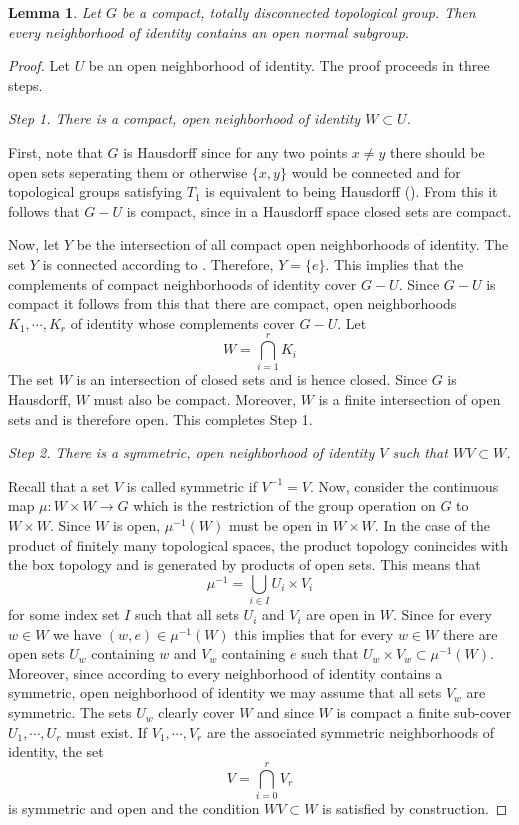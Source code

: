 \documentclass[12pt]{article}
\newtheorem{lem}[thm]{Lemma}
\theoremstyle{definition}
\theoremstyle{remark}
\begin{document}
    \begin{lem}\label{lem:ons}
        Let $G$ be a compact, totally disconnected topological group. Then every neighborhood of identity contains an open normal subgroup.
    \end{lem}

    \begin{proof}
        Let $U$ be an open neighborhood of identity. The proof proceeds in three steps.

        \noindent\emph{Step 1. There is a compact, open neighborhood of identity $W\subset U$.}

        First, note that $G$ is Hausdorff since for any two points $x\neq y$ there should be open sets seperating them or otherwise $\{x,y\}$ would be connected and for topological groups satisfying $T_1$ is equivalent to being Hausdorff (\cite[Proposition 1-3]{FANF1999}). From this it follows that $G-U$ is compact, since in a Hausdorff space closed sets are compact.

        Now, let $Y$ be the intersection of all compact open neighborhoods of identity. The set $Y$ is connected according to \cite[Lemma 1-16]{FANF1999}. Therefore, $Y=\{e\}$. This implies that the complements of compact neighborhoods of identity cover $G-U$. Since $G-U$ is compact it follows from this that there are compact, open neighborhoods $K_1,\cdots,K_r$ of identity whose complements cover $G-U$. Let
        $$
        W=\bigcap_{i=1}^r K_i
        $$
        The set $W$ is an intersection of closed sets and is hence closed. Since $G$ is Hausdorff, $W$ must also be compact. Moreover, $W$ is a finite intersection of open sets and is therefore open. This completes Step 1.
        
        \noindent\emph{Step 2. There is a symmetric, open neighborhood of identity $V$ such that $WV\subset W$.}

        Recall that a set $V$ is called symmetric if $V^{-1}=V$. Now, consider the continuous map $\mu\colon W\times W \to G$ which is the restriction of the group operation on $G$ to $W \times W$. Since $W$ is open, $\mu^{-1}(W)$ must be open in $W \times W$. In the case of the product of finitely many topological spaces, the product topology conincides with the box topology and is generated by products of open sets. This means that
        $$ \mu^{-1} = \bigcup_{i \in I} U_i \times V_i $$
        for some index set $I$ such that all sets $U_i$ and $V_i$ are open in $W$. Since for every $w \in W$ we have $(w,e)\in\mu^{-1}(W)$ this implies that for every $w\in W$ there are open sets $U_w$ containing $w$ and $V_w$ containing $e$ such that $U_w\times V_w\subset \mu^{-1}(W)$. Moreover, since according to \cite[Proposition 1-1(ii)]{FANF1999} every neighborhood of identity contains a symmetric, open neighborhood of identity we may assume that all sets $V_w$ are symmetric. The sets $U_w$ clearly cover $W$ and since $W$ is compact a finite sub-cover $U_1,\cdots,U_r$ must exist. If $V_1,\cdots,V_r$ are the associated symmetric neighborhoods of identity, the set
        $$ V = \bigcap_{i=0}^r V_r $$
        is symmetric and open and the condition $WV\subset W$ is satisfied by construction.


\end{proof}
\end{document}
